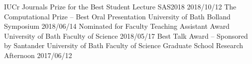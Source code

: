 \begin{cvpubs}
  \cvpub
    {IUCr Journals Prize for the Best Student Lecture}
    {SAS2018}
    {2018/10/12}
  \cvpub
    {The Computational Prize -- Best Oral Presentation}
    {University of Bath Bolland Symposium}
    {2018/06/14}
  \cvpub
    {Nominated for Faculty Teaching Assistant Award}
    {University of Bath Faculty of Science}
    {2018/05/17}
  \cvpub
    {Best Talk Award -- Sponsored by Santander}
    {University of Bath Faculty of Science Graduate School Research Afternoon}
    {2017/06/12}
\end{cvpubs}